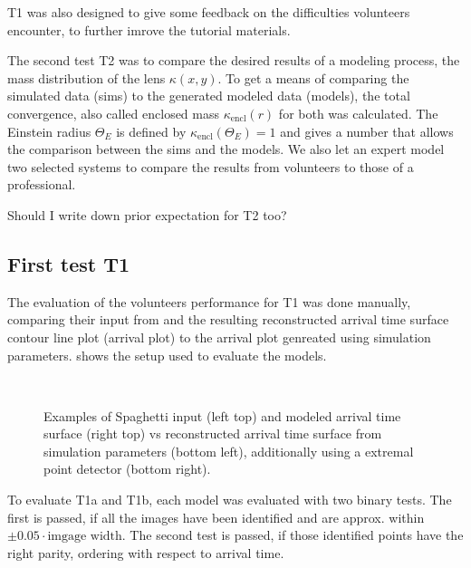 T1 was also designed to give some feedback on the difficulties volunteers encounter, to further imrove the tutorial materials.

The second test T2 was to compare the desired results of a modeling process, the mass distribution of the lens $\kappa(x, y)$.
To get a means of comparing the simulated data (sims) to the generated modeled data (models), the total convergence, also called enclosed mass $\kappa_{\text{encl}}(r)$ for both was calculated.
The Einstein radius $\Theta_E$ is defined by $\kappa_{\text{encl}}(\Theta_E)=1$ and gives a number that allows the comparison between the sims and the models.
We also let an expert model two selected systems to compare the results from volunteers to those of a professional.

\todo{!} Should I write down prior expectation for T2 too?




\subsection{First test T1} \label{sec:tests.t1}

The evaluation of the volunteers performance for T1 was done manually, comparing their input from \spl and the resulting reconstructed arrival time surface contour line plot (arrival plot) to the arrival plot genreated using simulation parameters.
 shows the setup used to evaluate the models.

\begin{figure}
  \centering
   \\
  \caption{Examples of Spaghetti input (left top) and modeled arrival time surface (right top) vs reconstructed arrival time surface from simulation parameters (bottom left), additionally using a extremal point detector (bottom right).}
  \label{fig:output_compare}
\end{figure}

To evaluate T1a and T1b, each model was evaluated with two binary tests.
The first is passed, if all the images have been identified and are approx. within $\pm0.05\cdot\text{imgage width}$.
The second test is passed, if those identified points have the right parity, ordering with respect to arrival time.

